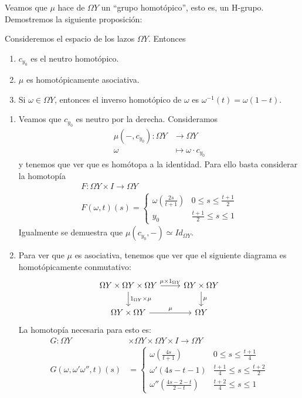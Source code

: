 Veamos que $\mu$ hace de $\Omega Y$ un ``grupo homotópico'', esto es, un H-grupo. Demostremos la siguiente proposición:
\begin{prop}
Consideremos el espacio de los lazos $\Omega Y$. Entonces
\begin{enumerate}
\item $c_{y_0}$ es el neutro homotópico.
\item $\mu$ es homotópicamente asociativa.
\item Si $\omega \in \Omega Y$, entonces el inverso homotópico de $\omega$ es $\omega^{-1}(t) = \omega(1 - t)$.
\end{enumerate}
\end{prop}
\begin{demo}
\begin{enumerate}
\item Veamos que $c_{y_0}$ es neutro por la derecha. Consideramos
\begin{align*}
\mu(-,c_{y_0}) : \Omega Y &\longrightarrow \Omega Y \\
\omega &\longmapsto \omega \cdotp c_{y_0}
\end{align*}
y tenemos que ver que es homótopa a la identidad. Para ello basta considerar la homotopía
\begin{align*}
F: \Omega Y \times I \longrightarrow \Omega Y \\
F(\omega, t)(s) = 
\begin{cases}
\omega\left(\frac{2s}{t+1}\right) & 0 \leq s \leq \frac{t+1}{2} \\
y_0													& \frac{t+1}{2} \leq s \leq 1
\end{cases}
\end{align*}
Igualmente se demuestra que $\mu(c_{y_0}, -) \simeq Id_{\Omega Y}$.
\item Para ver que $\mu$ es asociativa, tenemos que ver que el siguiente diagrama es homotópicamente conmutativo: 
\[
\begin{tikzcd}
	\Omega Y \times \Omega Y \times \Omega Y \rar{\mu \times 1_{\Omega Y}} \dar{1_{\Omega Y} \times \mu}
		  & \Omega Y \times \Omega Y \dar{\mu} \\
	\Omega Y \times \Omega Y \rar{\mu} 
		  & \Omega Y
\end{tikzcd}
\]
La homotopía necesaria para esto es:
\begin{align*}
G: 	\Omega Y &\times \Omega Y \times \Omega Y \times I \longrightarrow \Omega Y \\
G(\omega, \omega' \omega'', t)(s) &= 
\begin{cases}
\omega \left( \frac{4s}{t+1}\right) & 0 \leq s \leq \frac{t+1}{4} \\
\omega'(4s - t - 1)         		 & \frac{t+1}{4} \leq s \leq \frac{t+2}{2} \\
\omega''\left( \frac{4s -2 - t}{2-t}\right) & \frac{t+2}{4} \leq s \leq 1
\end{cases}
\end{align*}


\end{enumerate}
\end{demo}
